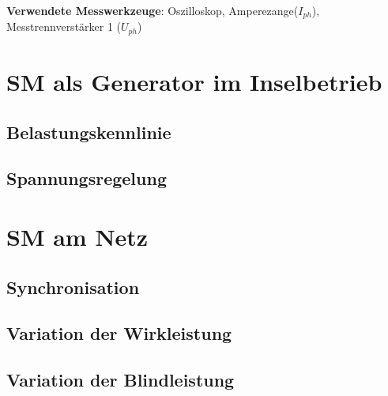 \begin{flushleft}
\vspace{0.4cm}
\textbf{Verwendete Messwerkzeuge}:  Oszilloskop, Amperezange($I_{ph}$),\\ Messtrennverstärker 1 ($U_{ph}$) 


\newpage
\section{SM als Generator im Inselbetrieb}
\subsection{Belastungskennlinie}
\subsection{Spannungsregelung}


\newpage
\section{SM am Netz}
\subsection{Synchronisation}
\subsection{Variation der Wirkleistung}
\subsection{Variation der Blindleistung}












\end{flushleft}